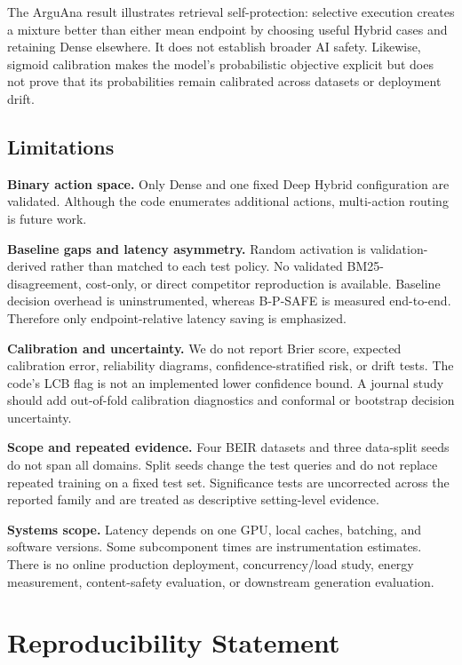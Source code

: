 \documentclass[10pt,journal]{IEEEtran}
\newcommand{\bpsafe}{B-P-SAFE}
\newcommand{\deephybrid}{Deep Hybrid}
\begin{document}
The ArguAna result illustrates retrieval self-protection: selective execution creates a mixture better than either mean endpoint by choosing useful Hybrid cases and retaining Dense elsewhere. It does not establish broader AI safety. Likewise, sigmoid calibration makes the model's probabilistic objective explicit but does not prove that its probabilities remain calibrated across datasets or deployment drift.

\subsection{Limitations}
\label{sec:limitations}

\textbf{Binary action space.} Only Dense and one fixed \deephybrid{} configuration are validated. Although the code enumerates additional actions, multi-action routing is future work.

\textbf{Baseline gaps and latency asymmetry.} Random activation is validation-derived rather than matched to each test policy. No validated BM25-disagreement, cost-only, or direct competitor reproduction is available. Baseline decision overhead is uninstrumented, whereas \bpsafe{} is measured end-to-end. Therefore only endpoint-relative latency saving is emphasized.

\textbf{Calibration and uncertainty.} We do not report Brier score, expected calibration error, reliability diagrams, confidence-stratified risk, or drift tests. The code's LCB flag is not an implemented lower confidence bound. A journal study should add out-of-fold calibration diagnostics and conformal or bootstrap decision uncertainty.

\textbf{Scope and repeated evidence.} Four BEIR datasets and three data-split seeds do not span all domains. Split seeds change the test queries and do not replace repeated training on a fixed test set. Significance tests are uncorrected across the reported family and are treated as descriptive setting-level evidence.

\textbf{Systems scope.} Latency depends on one GPU, local caches, batching, and software versions. Some subcomponent times are instrumentation estimates. There is no online production deployment, concurrency/load study, energy measurement, content-safety evaluation, or downstream generation evaluation.

\section{Reproducibility Statement}
\label{sec:reproducibility}
\end{document}
